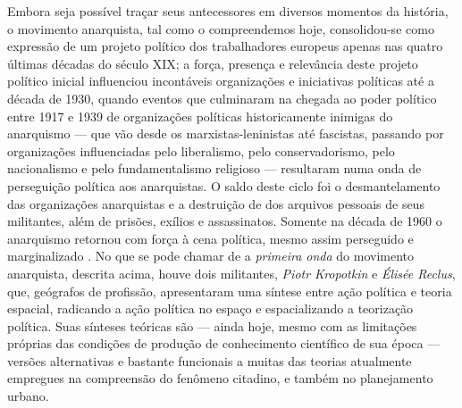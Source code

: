 Embora seja possível traçar seus antecessores em diversos momentos da história, o movimento anarquista, tal como o compreendemos hoje, consolidou-se como expressão de um projeto político dos trabalhadores europeus apenas nas quatro últimas décadas do século XIX; a força, presença e relevância deste projeto político inicial influenciou incontáveis organizações e iniciativas políticas até a década de 1930, quando eventos que culminaram na chegada ao poder político entre 1917 e 1939 de organizações políticas historicamente inimigas do anarquismo --- que vão desde os marxistas-leninistas até fascistas, passando por organizações influenciadas pelo liberalismo, pelo conservadorismo, pelo nacionalismo e pelo fundamentalismo religioso --- resultaram numa onda de perseguição política aos anarquistas. O saldo deste ciclo foi o desmantelamento das organizações anarquistas e a destruição de dos arquivos pessoais de seus militantes, além de prisões, exílios e assassinatos. Somente na década de 1960 o anarquismo retornou com força à cena política, mesmo assim perseguido e marginalizado \cite{WOODCOCK2008}. No que se pode chamar de a \textit{primeira onda} do movimento anarquista, descrita acima, houve dois militantes, \textit{Piotr Kropotkin} e \textit{Élisée Reclus}, que, geógrafos de profissão, apresentaram uma síntese entre ação política e teoria espacial, radicando a ação política no espaço e espacializando a teorização política. Suas sínteses teóricas são --- ainda hoje, mesmo com as limitações próprias das condições de produção de conhecimento científico de sua época --- versões alternativas e bastante funcionais a muitas das teorias atualmente empregues na compreensão do fenômeno citadino, e também no planejamento urbano.

